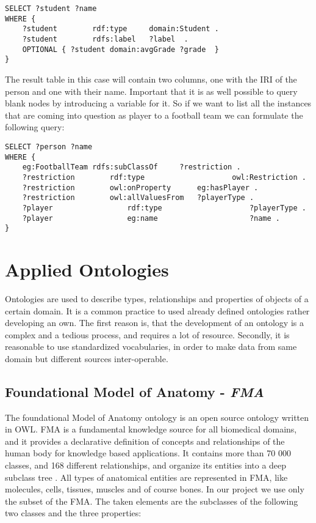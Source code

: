 \begin{lstlisting}[captionpos=b, caption=SPARQL Query II., label=2nd:sparql, belowskip=1em, aboveskip=2em,
basicstyle=\footnotesize,frame=single]
SELECT ?student ?name 
WHERE { 
	?student		rdf:type	 domain:Student .	
	?student		rdfs:label	 ?label  .
	OPTIONAL { ?student	domain:avgGrade	?grade  } 
}
\end{lstlisting}

The result table in this case will contain two columns, one with the IRI of the person and one with their name. Important that it is as well possible to query blank nodes by introducing a variable for it. So if we want to list all the instances that are coming into question as player to a football team we can formulate the following query:

\begin{lstlisting}[captionpos=b, caption=SPARQL Query III., label=3rd:sparql, belowskip=1em, aboveskip=2em,
basicstyle=\footnotesize,frame=single]
SELECT ?person ?name
WHERE {
	eg:FootballTeam	rdfs:subClassOf		?restriction .
	?restriction		rdf:type					owl:Restriction .
	?restriction		owl:onProperty		eg:hasPlayer .
	?restriction		owl:allValuesFrom	?playerType .
	?player					rdf:type					?playerType .
	?player					eg:name						?name . 
}
\end{lstlisting}

\newpage
\section{Applied Ontologies} \label{22}

Ontologies are used to describe types, relationships and properties of objects of a certain domain. It is a common practice to used already defined 
ontologies rather developing an own. The first reason is, that the development of an ontology is a complex and a tedious process, and requires a lot of resource. Secondly, it is reasonable to use standardized vocabularies, in order to make data from same domain but different sources inter-operable.

\subsection{Foundational Model of Anatomy - \textit{FMA}}  \label{fma}

The foundational Model of Anatomy ontology is an open source ontology written in OWL. FMA is a fundamental knowledge source for all biomedical domains, and it provides a declarative definition of concepts and relationships of the human body for knowledge based applications. It contains more than 70 000 classes, and 168 different relationships, and organize its entities into a deep subclass tree \cite{Rosse2003478}. All types of anatomical entities are represented in FMA, like molecules, cells, tissues, muscles and of course bones. In our project we use only the subset of the FMA. The taken elements are the subclasses of the following two classes and the three properties: 

